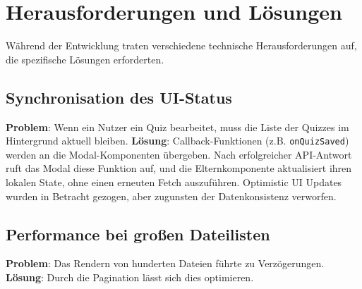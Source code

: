 \section{Herausforderungen und Lösungen}
Während der Entwicklung traten verschiedene technische Herausforderungen auf, die spezifische Lösungen erforderten.

\subsection{Synchronisation des UI-Status}
\textbf{Problem}: Wenn ein Nutzer ein Quiz bearbeitet, muss die Liste der Quizzes im Hintergrund aktuell bleiben.
\newline
\textbf{Lösung}: Callback-Funktionen (z.B. \texttt{onQuizSaved}) werden an die Modal-Komponenten übergeben. Nach erfolgreicher API-Antwort ruft das Modal diese Funktion auf, und die Elternkomponente aktualisiert ihren lokalen State, ohne einen erneuten Fetch auszuführen. Optimistic UI Updates wurden in Betracht gezogen, aber zugunsten der Datenkonsistenz verworfen.

\subsection{Performance bei großen Dateilisten}
\textbf{Problem}: Das Rendern von hunderten Dateien führte zu Verzögerungen.
\newline
\textbf{Lösung}: Durch die Pagination lässt sich dies optimieren.
\newpage
